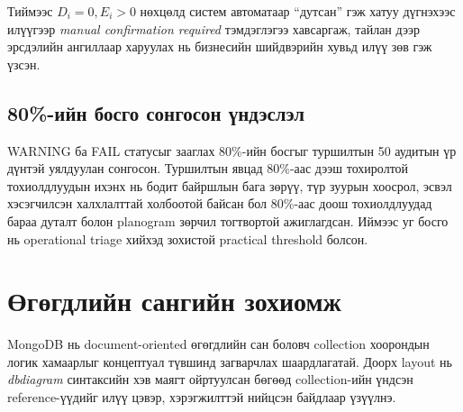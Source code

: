 Тиймээс \(D_i = 0, E_i > 0\) нөхцөлд систем автоматаар ``дутсан'' гэж хатуу дүгнэхээс илүүгээр \textit{manual confirmation required} тэмдэглэгээ хавсаргаж, тайлан дээр эрсдэлийн ангиллаар харуулах нь бизнесийн шийдвэрийн хувьд илүү зөв гэж үзсэн.

\subsection{80\%-ийн босго сонгосон үндэслэл}

WARNING ба FAIL статусыг зааглах 80\%-ийн босгыг туршилтын 50 аудитын үр дүнтэй уялдуулан сонгосон. Туршилтын явцад 80\%-аас дээш тохиролтой тохиолдлуудын ихэнх нь бодит байршлын бага зөрүү, түр зуурын хоосрол, эсвэл хэсэгчилсэн халхлалттай холбоотой байсан бол 80\%-аас доош тохиолдлуудад бараа дуталт болон planogram зөрчил тогтвортой ажиглагдсан. Иймээс уг босго нь operational triage хийхэд зохистой practical threshold болсон.

\section{Өгөгдлийн сангийн зохиомж}

MongoDB нь document-oriented өгөгдлийн сан боловч collection хоорондын логик хамаарлыг концептуал түвшинд загварчлах шаардлагатай. Доорх layout нь \textit{dbdiagram} синтаксийн хэв маягт ойртуулсан бөгөөд collection-ийн үндсэн reference-үүдийг илүү цэвэр, хэрэгжилттэй нийцсэн байдлаар үзүүлнэ.

